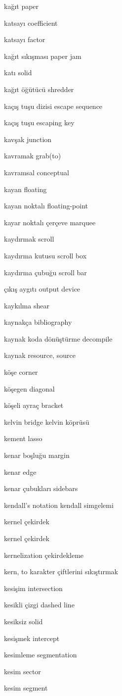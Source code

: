 \documentclass[12pt,fleqn]{article}\usepackage{../../common}
\begin{document}
kağıt paper

katsayı coefficient

katsayı factor

kağıt sıkışması paper jam

katı solid

kağıt öğütücü shredder

kaçış tuşu dizisi escape sequence

kaçış tuşu escaping key

kavşak junction

kavramak grab(to)

kavramsal conceptual

kayan floating

kayan noktalı floating-point

kayar noktalı çerçeve marquee

kaydırmak scroll

kaydırma kutusu scroll box

kaydırma çubuğu scroll bar

çıkış aygıtı output device

kaykılma shear

kaynakça bibliography

kaynak koda dönüştürme decompile

kaynak resource, source

köşe corner

köşegen diagonal

köşeli ayraç bracket

kelvin bridge kelvin köprüsü

kement lasso

kenar boşluğu margin

kenar edge

kenar çubukları sidebars

kendall's notation kendall simgelemi

kernel çekirdek

kernel çekirdek

kernelization çekirdekleme

kern, to karakter çiftlerini sıkıştırmak

kesişim intersection

kesikli çizgi dashed line

kesiksiz solid

kesişmek intercept

kesimleme segmentation

kesim sector

kesim segment
\end{document}
